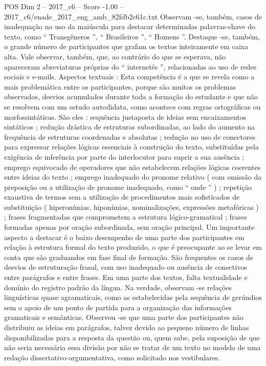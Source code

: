 \begin{textsample}{POS Dim 2 – 2017\_c6 – Score -1.00 – 2017\_c6/enade\_2017\_eng\_amb\_82fdb2c61c.txt}
Observam -se, também, casos de inadequação no uso da maiúscula para destacar determinadas palavras-chave do texto, como “ Transgêneros ”, “ Brasileiros ”, “ Homens ”.
Destaque -se, também, o grande número de participantes que grafam os textos inteiramente em caixa alta.
Vale observar, também, que, ao contrário do que se esperava, não apareceram abreviaturas próprias do “ internetês ”, relacionadas ao uso de redes sociais e e-mails.
Aspectos textuais : Esta competência é a que se revela como a mais problemática entre os participantes, porque são muitos os problemas observados, desvios acumulados durante toda a formação do estudante e que não se resolvem com um estudo autodidata, como acontece com regras ortográficas ou morfossintáticas.
São eles : sequência justaposta de ideias sem encaixamentos sintáticos ; redução drástica de estruturas subordinadas, ao lado do aumento na frequência de estruturas coordenadas e absolutas ; redução no uso de conectores para expressar relações lógicas essenciais à construção do texto, substituídas pela exigência de inferência por parte do interlocutor para suprir a sua ausência ; emprego equivocado de operadores que não estabelecem relações lógicas coerentes entre ideias do texto ; emprego inadequado do pronome relativo ( com omissão da preposição ou a utilização de pronome inadequado, como “ onde ” ) ; repetição exaustiva de termos sem a utilização de procedimentos mais sofisticados de substituição ( hiperonímias, hiponímias, nominalizações, expressões metafóricas ) ; frases fragmentadas que comprometem a estrutura lógico-gramatical ; frases formadas apenas por oração subordinada, sem oração principal.
Um importante aspecto a destacar é o baixo desempenho de uma parte dos participantes em relação à estrutura formal do texto produzido, o que é preocupante ao se levar em conta que são graduandos em fase final de formação.
São frequentes os casos de desvios de estruturação frasal, com uso inadequado ou ausência de conectivos entre parágrafos e entre frases.
Em uma parte dos textos, falta textualidade e domínio do registro padrão da língua.
Na verdade, observam -se relações linguísticas quase agramaticais, como as estabelecidas pela sequência de gerúndios sem o apoio de um ponto de partida para a organização das informações gramaticais e semânticas.
Observou -se que uma parte dos participantes não distribuiu as ideias em parágrafos, talvez devido ao pequeno número de linhas disponibilizadas para a resposta da questão ou, quem sabe, pela suposição de que não seria necessária essa divisão por não se tratar de um texto no modelo de uma redação dissertativo-argumentativa, como solicitado nos vestibulares.

\end{textsample}
